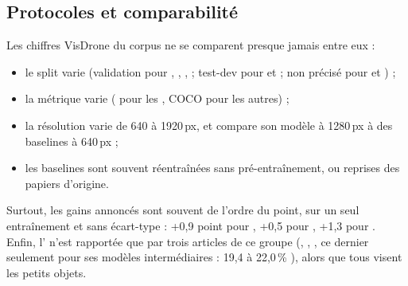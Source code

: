 \subsection{Protocoles et comparabilité}

Les chiffres VisDrone du corpus ne se comparent presque jamais entre eux :
\begin{itemize}
  \item le split varie (validation pour , , ,
     ; test-dev pour  et  ; non précisé pour  et
    ) ;
  \item la métrique varie ( pour les ,  COCO pour les autres) ;
  \item la résolution varie de 640 à 1920\,px, et  compare son modèle à
    1280\,px à des baselines à 640\,px \citep[§5]{arxiv-2604.13278-dronescan-yolo-redundancy-aware-lightweight} ;
  \item les baselines sont souvent réentraînées sans pré-entraînement, ou reprises des
    papiers d'origine.
\end{itemize}
Surtout, les gains annoncés sont souvent de l'ordre du point, sur un seul entraînement et
sans écart-type : +0,9 point pour \citet{2022-jung-improved-yolov5-efficient-object-detection},
+0,5 pour , +1,3 pour . Enfin, l' n'est rapportée que par trois
articles de ce groupe (, , , ce dernier seulement pour ses
modèles intermédiaires : 19,4 à 22,0\,\% \citep[Tables~9, 12]{2023-fu-efficient-yolov7-drone-enhanced-object}),
alors que tous visent les petits objets.
